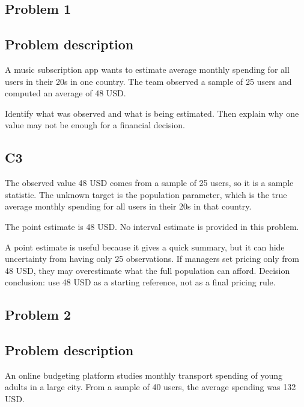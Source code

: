 


	\begin{ExamProblems}
		\item
		\subsection*{Problem 1}
		\subsection*{Problem description}
		A music subscription app wants to estimate average monthly spending for all users in their 20s in one country.
		The team observed a sample of 25 users and computed an average of 48 USD.

		Identify what was observed and what is being estimated.
		Then explain why one value may not be enough for a financial decision.

		\subsection*{C3}
		The observed value 48 USD comes from a sample of 25 users, so it is a sample statistic.
		The unknown target is the population parameter, which is the true average monthly spending for all users in their 20s in that country.

		The point estimate is 48 USD.
		No interval estimate is provided in this problem.

		A point estimate is useful because it gives a quick summary, but it can hide uncertainty from having only 25 observations.
		If managers set pricing only from 48 USD, they may overestimate what the full population can afford.
		Decision conclusion: use 48 USD as a starting reference, not as a final pricing rule.

		\newpage
		\item
		\subsection*{Problem 2}
		\subsection*{Problem description}
		An online budgeting platform studies monthly transport spending of young adults in a large city.
		From a sample of 40 users, the average spending was 132 USD.


\end{ExamProblems}
